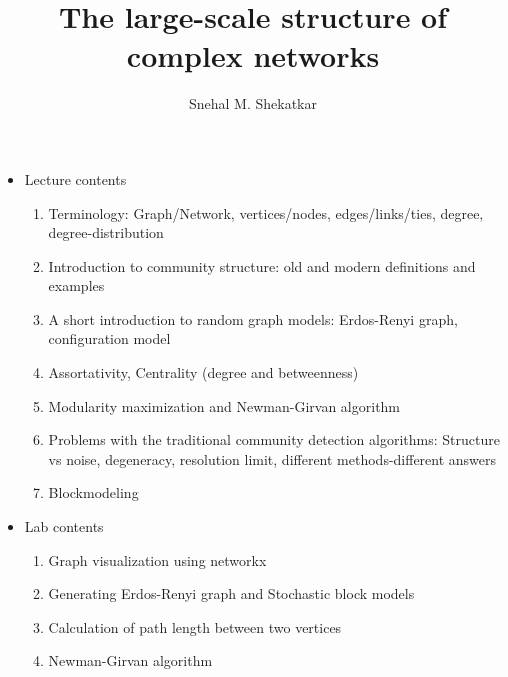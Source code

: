 \documentclass{article}
\title{The large-scale structure of complex networks}
\author{Snehal M. Shekatkar}
\date{}
\begin{document}
\maketitle
    \begin{itemize}
        \item{Lecture contents}
            \begin{enumerate}
                \item{Terminology: Graph/Network, vertices/nodes, edges/links/ties, degree, degree-distribution}
                \item{Introduction to community structure: old and modern definitions and examples}
                \item{A short introduction to random graph models: Erdos-Renyi graph, configuration model}
                \item{Assortativity, Centrality (degree and betweenness)}
                \item{Modularity maximization and Newman-Girvan algorithm}
                \item{Problems with the traditional community detection algorithms: Structure vs noise, degeneracy, resolution limit, different methods-different answers}
                \item{Blockmodeling}
            \end{enumerate}
        \item{Lab contents}
            \begin{enumerate}
                \item{Graph visualization using networkx}
                \item{Generating Erdos-Renyi graph and Stochastic block models}
                \item{Calculation of path length between two vertices}
                \item{Newman-Girvan algorithm}
            \end{enumerate}
    \end{itemize}
\end{document}
